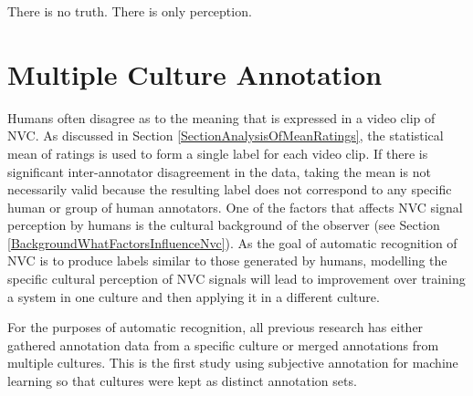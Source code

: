 
\begin{savequote}
There is no truth. There is only perception.
\end{savequote}

\chapter[Multiple Culture Annotation]{Multiple Culture Annotation}
\label{ChapterAnnotation}






Humans often disagree as to the meaning that is expressed in a video clip of \ac{NVC}. As discussed in Section \ref{SectionAnalysisOfMeanRatings}, the statistical mean of ratings is used to form a single label for each video clip. If there is significant inter-annotator disagreement in the data, taking the mean is not necessarily valid because the resulting label does not correspond to any specific human or group of human annotators. One of the factors that affects \ac{NVC} signal perception by humans is the cultural background of the observer (see Section \ref{BackgroundWhatFactorsInfluenceNvc}). As the goal of automatic recognition of \ac{NVC} is to produce labels similar to those generated by humans, modelling the specific cultural perception of \ac{NVC} signals will lead to improvement over training a system in one culture and then applying it in a different culture.%

For the purposes of automatic recognition, all previous research has either gathered annotation data from a specific culture or merged annotations from multiple cultures. This is the first study using subjective annotation for machine learning so that cultures were kept as distinct annotation sets. 

